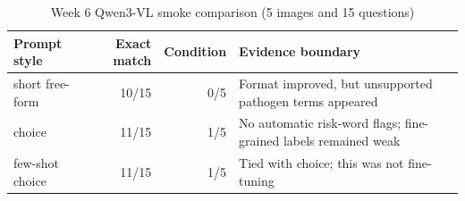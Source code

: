 \begin{table}[htbp]
\centering
\caption{Week 6 Qwen3-VL smoke comparison (5 images and 15 questions)}
\label{tab:week6-vlm-en}
\begin{tabular}{lrrp{}}
\toprule
Prompt style & Exact match & Condition & Evidence boundary \\
\midrule
short free-form & 10/15 & 0/5 & Format improved, but unsupported pathogen terms appeared \\
choice & 11/15 & 1/5 & No automatic risk-word flags; fine-grained labels remained weak \\
few-shot choice & 11/15 & 1/5 & Tied with choice; this was not fine-tuning \\
\bottomrule
\end{tabular}
\end{table}
